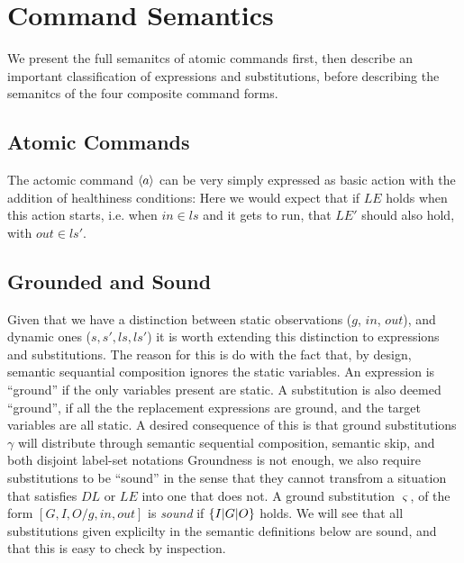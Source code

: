 \section{Command Semantics}\label{sec:semantics}

We present the full semanitcs of atomic commands first,
then describe an important classification of expressions and substitutions,
before describing the semanitcs of the four composite command forms.

\subsection{Atomic Commands}\label{ssec:atomic}

The actomic command $\langle a\rangle$ can be very simply expressed as basic action
with the addition of healthiness conditions:
Here we would expect that if $LE$ holds when this action starts,
i.e. when $in \in ls$ and it gets to run,
that $LE'$ should also hold, with $out \in ls'$.

\subsection{Grounded and Sound}

Given that we have a distinction between static observations ($g$, $in$, $out$),
and dynamic ones ($s,s',ls,ls'$) it is worth extending this distinction
to expressions and substitutions.
The reason for this is do with the fact that, by design,
semantic sequantial composition ignores the static variables.
An expression is ``ground'' if the only variables present are static.
A substitution is also deemed ``ground'',
if all the the replacement expressions are ground,
and the target variables are all static.
A desired consequence of this is that
ground substitutions $\gamma$
will distribute through semantic sequential composition,
semantic skip,
and both disjoint label-set notations
Groundness is not enough, we also require substitutions to be ``sound''
in the sense that they cannot transfrom a situation that satisfies $DL$
or $LE$ into one that does not.
A ground substitution $\varsigma$, of the form $[G,I,O/g,in,out]$ is \emph{sound}
if $\{{I|G|O}\}$ holds.
We will see that all substitutions given explicilty in the semantic definitions
below are sound, and that this is easy to check by inspection.


